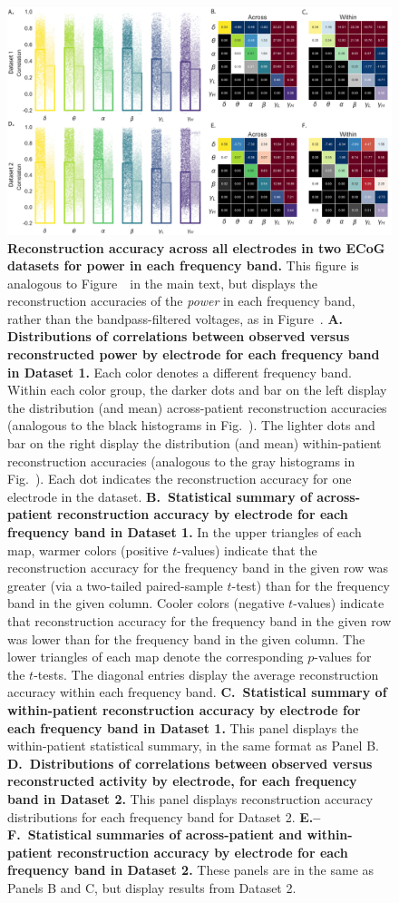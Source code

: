 \documentclass[11pt]{article}
\begin{document}
\begin{figure}[p]
\centering
\includegraphics[width=\textwidth]{figs/supplemental_4}
\caption{\textbf{Reconstruction accuracy across all electrodes in two ECoG
datasets for power in each frequency band.} This figure is analogous to
Figure~\freqs~in the main text, but displays the reconstruction accuracies of
the \textit{power} in each frequency band, rather than the bandpass-filtered
voltages, as in Figure~\freqs. \textbf{A. Distributions of correlations between
observed versus reconstructed power by electrode for each frequency band in
Dataset 1.}  Each color denotes a different frequency band. Within each color
group, the darker dots and bar on the left display the distribution (and mean)
across-patient reconstruction accuracies (analogous to the black histograms in
Fig.~\corrmaps).  The lighter dots and bar on the right display the distribution
(and mean) within-patient reconstruction accuracies (analogous to the gray
histograms in Fig.~\corrmaps). Each dot indicates the reconstruction accuracy
for one electrode in the dataset. \textbf{B.~Statistical summary of
across-patient reconstruction accuracy by electrode for each frequency band in
Dataset 1.} In the upper triangles of each map, warmer colors (positive
$t$-values) indicate that the reconstruction accuracy for the frequency band in
the given row was greater (via a two-tailed paired-sample $t$-test) than for the
frequency band in the given column. Cooler colors (negative $t$-values) indicate
that reconstruction accuracy for the frequency band in the given row was lower
than for the frequency band in the given column. The lower triangles of each map
denote the corresponding $p$-values for the $t$-tests. The diagonal entries
display the average reconstruction accuracy within each frequency band.
\textbf{C.~Statistical summary of within-patient reconstruction accuracy by
electrode for each frequency band in Dataset 1.} This panel displays the
within-patient statistical summary, in the same format as Panel B.
\textbf{D.~Distributions of correlations between observed versus reconstructed
activity by electrode, for each frequency band in Dataset 2.} This panel
displays reconstruction accuracy distributions for each frequency band for
Dataset 2. \textbf{E.--F.~Statistical summaries of across-patient and
within-patient reconstruction accuracy by electrode for each frequency band in
Dataset 2.} These panels are in the same as Panels B and C, but display results
from Dataset 2.}
\label{fig:supplemental_4}
\end{figure}
\end{document}
